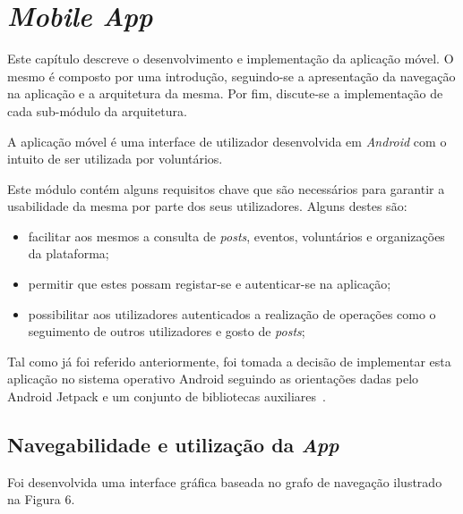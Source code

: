 

\pagebreak
\hspace{0pt}
\vfill
{
	\section{\textit{Mobile App}}
	Este capítulo descreve o desenvolvimento e implementação da aplicação móvel. O mesmo é composto por uma introdução, seguindo-se a apresentação da navegação na aplicação e a arquitetura da mesma. Por fim, discute-se a implementação de cada sub-módulo da arquitetura.
	
	\par \medskip
	
	A aplicação móvel é uma interface de utilizador desenvolvida em \textit{Android} com o intuito de ser utilizada por voluntários.
	
	\par \medskip
	
	Este módulo contém alguns requisitos chave que são necessários para garantir a usabilidade da mesma por parte dos seus utilizadores. Alguns destes são:
	
	\begin{itemize}
		\item facilitar aos mesmos a consulta de \textit{posts}, eventos, voluntários e organizações da plataforma;
		\item permitir que estes possam registar-se e autenticar-se na aplicação;
		\item possibilitar aos utilizadores autenticados a realização de operações como o seguimento de outros utilizadores e gosto de \textit{posts};
	\end{itemize}
	
	\par \medskip
	
	Tal como já foi referido anteriormente, foi tomada a decisão de implementar esta aplicação no sistema operativo Android seguindo as orientações dadas pelo Android Jetpack e um conjunto de bibliotecas auxiliares~\cite{Gargenta2014}.
}
\vfill
\hspace{0pt}
\pagebreak

\subsection{Navegabilidade e utilização da \textit{App}}

Foi desenvolvida uma interface gráfica baseada no grafo de navegação ilustrado na Figura 6.

